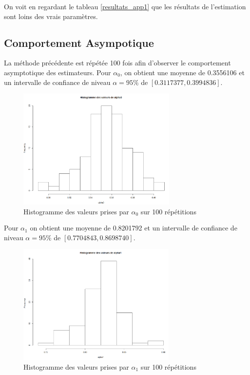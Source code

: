 \documentclass[11pt]{article}
\begin{document}
	On voit en regardant le tableau \ref{resultats_app1} que les résultats de l'estimation sont loins des vrais paramètres.\\


\subsection{Comportement Asympotique}

	La méthode précédente est répétée 100 fois afin d'observer le comportement asymptotique des estimateurs.
	Pour $\alpha_{0}$,  on obtient une moyenne de 0.3556106 et un intervalle de confiance de niveau $ \alpha = 95\% $ de $[0.3117377,0.3994836]$.
	
	\begin{figure}[H]
		\centering
		\includegraphics[height=6cm]{alpha0.png}
		\caption[Paramètre $\alpha_{0}$]{Histogramme des valeurs prises par $\alpha_{0}$ sur 100 répétitions} 
		\label{alpha0}
	\end{figure}
		
	Pour $\alpha_{1}$ on obtient une moyenne de  0.8201792 et un intervalle de confiance de niveau $\alpha = 95\% $ de $[0.7704843,0.8698740]$.

	\begin{figure}[H]
		\centering
		\includegraphics[height=6cm]{alpha1.png}
		\caption[Paramètre $\alpha_{1}$]{Histogramme des valeurs prises par $\alpha_{1}$ sur 100 répétitions} 
		\label{alpha1}
	\end{figure}
		
\end{document}

